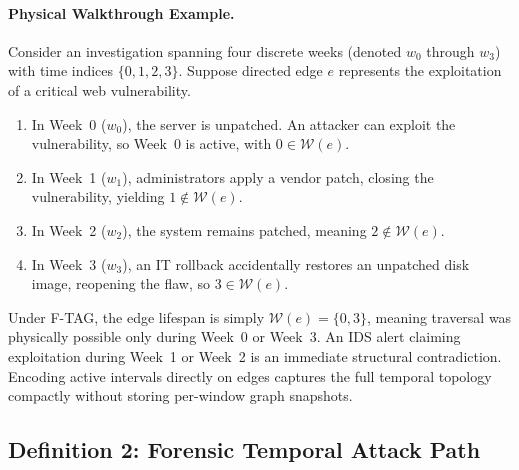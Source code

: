 \documentclass[12pt]{article}
\begin{document}
\paragraph{Physical Walkthrough Example.} 
Consider an investigation spanning four discrete weeks (denoted $w_0$ through $w_3$) with time indices $\{0, 1, 2, 3\}$. Suppose directed edge $e$ represents the exploitation of a critical web vulnerability.
\begin{enumerate}
    \item In Week~0 ($w_0$), the server is unpatched. An attacker can exploit the vulnerability, so Week~0 is active, with $0 \in \mathcal{W}(e)$.
    \item In Week~1 ($w_1$), administrators apply a vendor patch, closing the vulnerability, yielding $1 \notin \mathcal{W}(e)$.
    \item In Week~2 ($w_2$), the system remains patched, meaning $2 \notin \mathcal{W}(e)$.
    \item In Week~3 ($w_3$), an IT rollback accidentally restores an unpatched disk image, reopening the flaw, so $3 \in \mathcal{W}(e)$.
\end{enumerate}
Under F-TAG, the edge lifespan is simply $\mathcal{W}(e) = \{0, 3\}$, meaning traversal was physically possible only during Week~0 or Week~3. An IDS alert claiming exploitation during Week~1 or Week~2 is an immediate structural contradiction. Encoding active intervals directly on edges captures the full temporal topology compactly without storing per-window graph snapshots.

\subsection{Definition 2: Forensic Temporal Attack Path}\label{sec:def2}
\end{document}
